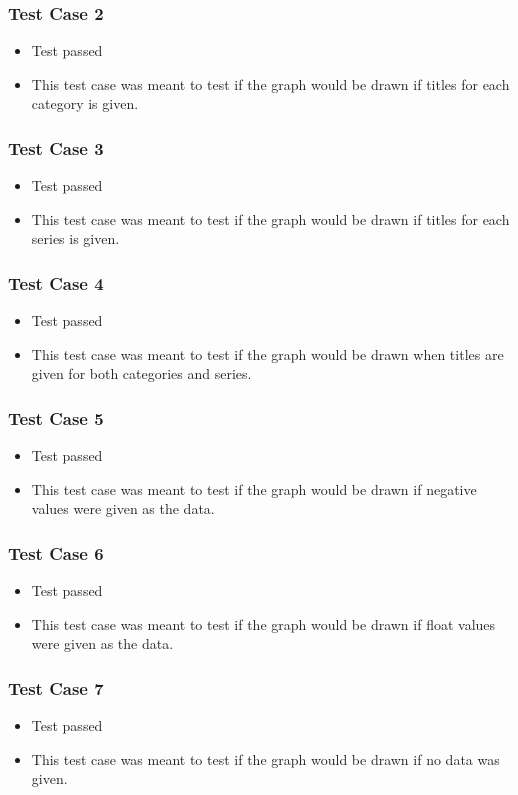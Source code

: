 \documentclass[a4paper,12pt]{article}
\begin{document}
\subsubsection{Test Case 2}
\begin{itemize}
	\item Test passed
	\item This test case was meant to test if the graph would be drawn if titles for each category is given.
\end{itemize}
\subsubsection{Test Case 3}
\begin{itemize}
	\item Test passed
	\item This test case was meant to test if the graph would be drawn if titles for each series is given.
\end{itemize}
\subsubsection{Test Case 4}
\begin{itemize}
	\item Test passed
	\item This test case was meant to test if the graph would be drawn when titles are given for both categories and series.
\end{itemize}
\subsubsection{Test Case 5}
\begin{itemize}
	\item Test passed
	\item This test case was meant to test if the graph would be drawn if negative values were given as the data.
\end{itemize}
\subsubsection{Test Case 6}
\begin{itemize}
	\item Test passed
	\item This test case was meant to test if the graph would be drawn if float values were given as the data.
\end{itemize}
\subsubsection{Test Case 7}
\begin{itemize}
	\item Test passed
	\item This test case was meant to test if the graph would be drawn if no data was given.
\end{itemize}
\end{document}
